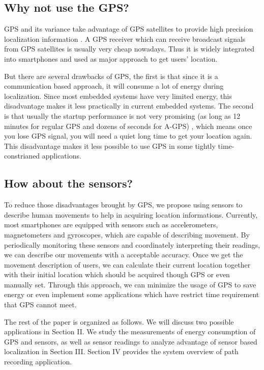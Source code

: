 \documentclass[journal]{IEEEtran}
\begin{document}
\subsection{Why not use the GPS?}
GPS and its variance take advantage of GPS satellites to provide high precision localization information \cite{GPS}. 
A GPS receiver which can receive broadcast signals from GPS satellites is usually very cheap nowadays. 
Thus it is widely integrated into smartphones and used as major approach to get users' location. 

But there are several drawbacks of GPS, the first is that since it is a communication based approach, it will consume a lot of energy during localization. 
Since most embedded systems have very limited energy, this disadvantage makes it less practically in current embedded systems.
The second is that usually the startup performance is not very promising (as long as 12 minutes for regular GPS and dozens of seconds for A-GPS) \cite{A-GPS}, which means once you lose GPS signal, you will need a quiet long time to get your location again. 
This disadvantage makes it less possible to use GPS in some tightly time-constrianed applications. 

\subsection{How about the sensors?}
To reduce those disadvantages brought by GPS, we propose using sensors to describe human movements to help in acquiring location informations. 
Currently, most smartphones are equipped with sensors such as accelerometers, magnetometers and gyroscopes, which are capable of describing movement. 
By periodically monitoring these sensors and coordinately interpreting their readings, we can describe our movements with a acceptable accuracy. 
Once we get the movement description of users, we can calculate their current location together with their initial location which should be acquired though GPS or even manually set. 
Through this approach, we can minimize the usage of GPS to save energy or even implement some applications which have restrict time requirement that GPS cannot meet. 

The rest of the paper is organized as follows.
We will discuss two possible applications in Section II.
We study the measurements of energy consumption of GPS and sensors, as well as sensor readings to analyze advantage of sensor based localization in Section III.
Section IV provides the system overview of path recording application.
\end{document}
